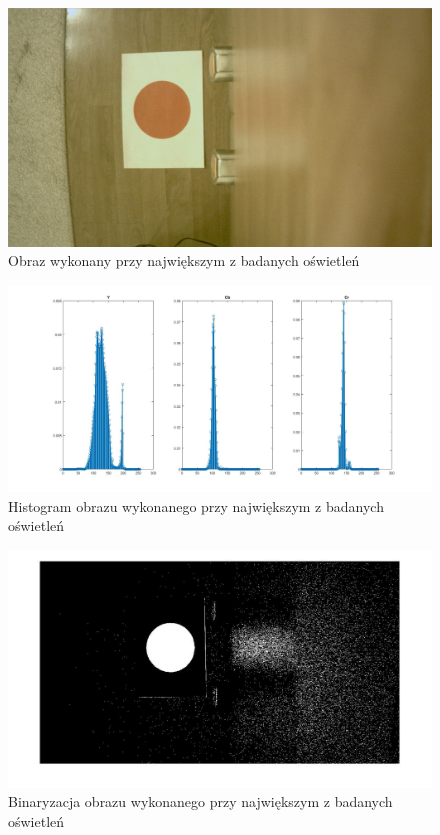 \begin{figure}[h]
	\centering
	\includegraphics[width=\textwidth]{osw3.jpg}
	\caption{Obraz wykonany przy największym z badanych oświetleń}
	\label{fig:osw3}
\end{figure}
\begin{figure}[h]
	\centering
	\includegraphics[width=\textwidth]{hist3.jpg}
	\caption{Histogram obrazu wykonanego przy największym z badanych oświetleń}
	\label{fig:hist3}
\end{figure}
\begin{figure}[h]
	\centering
	\includegraphics[width=\textwidth]{bin3.jpg}
	\caption{Binaryzacja obrazu wykonanego przy największym z badanych oświetleń}
	\label{fig:bin3}
\end{figure}

